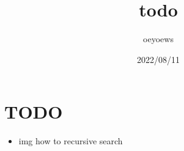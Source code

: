 \documentclass[UTF8]{article}
\title{todo \emoji{check-mark-button}}
\author{oeyoews}
\date{2022/08/11}
\begin{document}

\maketitle

\section{TODO }%
\label{sec:TODO}

\begin{itemize}
  \item img how to recursive search
\end{itemize}
\end{document}
